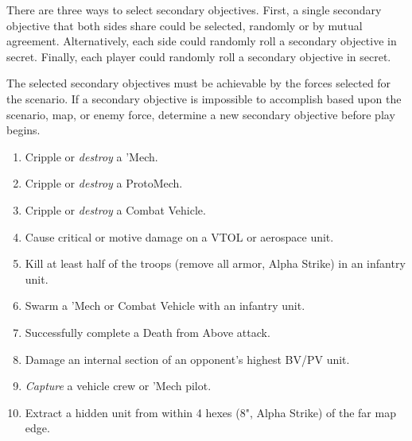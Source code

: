There are three ways to select secondary objectives.
First, a single secondary objective that both sides share could be selected, randomly or by mutual agreement.
Alternatively, each side could randomly roll a secondary objective in secret.
Finally, each player could randomly roll a secondary objective in secret.

The selected secondary objectives must be achievable by the forces selected for the scenario.
If a secondary objective is impossible to accomplish based upon the scenario, map, or enemy force, determine a new secondary objective before play begins.

\begin{enumerate}

\item Cripple or \emph{destroy} a 'Mech.

\item Cripple or \emph{destroy} a ProtoMech.

\item Cripple or \emph{destroy} a Combat Vehicle.

\item Cause critical or motive damage on a VTOL or aerospace unit.

\item Kill at least half of the troops (remove all armor, Alpha Strike) in an infantry unit.

\item Swarm a 'Mech or Combat Vehicle with an infantry unit.

\item Successfully complete a Death from Above attack.

\item Damage an internal section of an opponent's highest BV/PV unit.

\item \emph{Capture} a vehicle crew or 'Mech pilot.

\item Extract a hidden unit from within 4 hexes (8", Alpha Strike) of the far map edge.

\end{enumerate}
